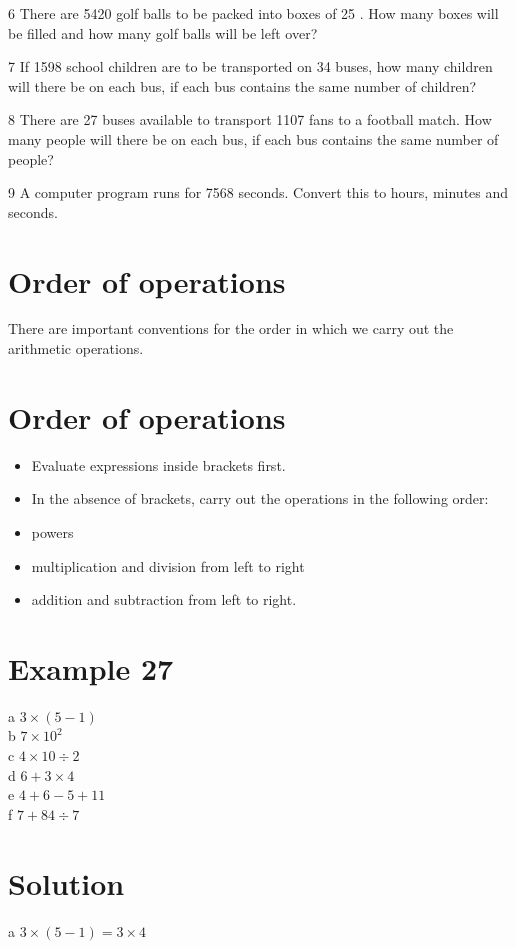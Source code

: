\documentclass[10pt]{article}
\begin{document}
6 There are 5420 golf balls to be packed into boxes of 25 . How many boxes will be filled and how many golf balls will be left over?

7 If 1598 school children are to be transported on 34 buses, how many children will there be on each bus, if each bus contains the same number of children?

8 There are 27 buses available to transport 1107 fans to a football match. How many people will there be on each bus, if each bus contains the same number of people?

9 A computer program runs for 7568 seconds. Convert this to hours, minutes and seconds.

\section*{Order of operations}
There are important conventions for the order in which we carry out the arithmetic operations.

\section*{Order of operations}
\begin{itemize}
  \item Evaluate expressions inside brackets first.
  \item In the absence of brackets, carry out the operations in the following order:
  \item powers
  \item multiplication and division from left to right
  \item addition and subtraction from left to right.
\end{itemize}

\section*{Example 27}
a \(3 \times(5-1)\)\\
b \(7 \times 10^{2}\)\\
c \(4 \times 10 \div 2\)\\
d \(6+3 \times 4\)\\
e \(4+6-5+11\)\\
f \(7+84 \div 7\)

\section*{Solution}
a \(3 \times(5-1)=3 \times 4\)
\end{document}
